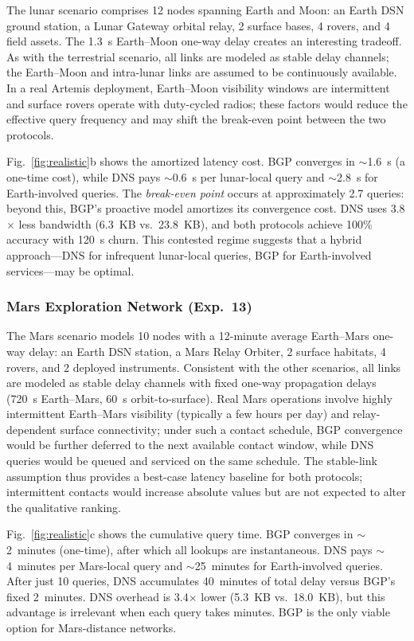 \documentclass[journal,twocolumn]{IEEEtran}
\begin{document}
The lunar scenario comprises 12 nodes spanning Earth and Moon: an Earth DSN ground station, a Lunar Gateway orbital relay, 2 surface bases, 4 rovers, and 4 field assets.
The 1.3~s Earth--Moon one-way delay creates an interesting tradeoff.
As with the terrestrial scenario, all links are modeled as stable delay channels; the Earth--Moon and intra-lunar links are assumed to be continuously available.
In a real Artemis deployment, Earth--Moon visibility windows are intermittent and surface rovers operate with duty-cycled radios; these factors would reduce the effective query frequency and may shift the break-even point between the two protocols.

Fig.~\ref{fig:realistic}b shows the amortized latency cost. 
BGP converges in $\sim$1.6~s (a one-time cost), while DNS pays $\sim$0.6~s per lunar-local query and $\sim$2.8~s for Earth-involved queries. 
The \emph{break-even point} occurs at approximately 2.7 queries: beyond this, BGP's proactive model amortizes its convergence cost. 
DNS uses 3.8$\times$ less bandwidth (6.3~KB vs.\ 23.8~KB), and both protocols achieve 100\% accuracy with 120~s churn. 
This contested regime suggests that a hybrid approach---DNS for infrequent lunar-local queries, BGP for Earth-involved services---may be optimal.

\subsubsection{Mars Exploration Network (Exp.~13)}

The Mars scenario models 10 nodes with a 12-minute average Earth--Mars one-way delay: an Earth DSN station, a Mars Relay Orbiter, 2 surface habitats, 4 rovers, and 2 deployed instruments.
Consistent with the other scenarios, all links are modeled as stable delay channels with fixed one-way propagation delays (720~s Earth--Mars, 60~s orbit-to-surface).
Real Mars operations involve highly intermittent Earth--Mars visibility (typically a few hours per day) and relay-dependent surface connectivity; under such a contact schedule, BGP convergence would be further deferred to the next available contact window, while DNS queries would be queued and serviced on the same schedule.
The stable-link assumption thus provides a best-case latency baseline for both protocols; intermittent contacts would increase absolute values but are not expected to alter the qualitative ranking.

Fig.~\ref{fig:realistic}c shows the cumulative query time. 
BGP converges in $\sim$2~minutes (one-time), after which all lookups are instantaneous. 
DNS pays $\sim$4~minutes per Mars-local query and $\sim$25~minutes for Earth-involved queries. 
After just 10 queries, DNS accumulates 40~minutes of total delay versus BGP's fixed 2~minutes. 
DNS overhead is 3.4$\times$ lower (5.3~KB vs.\ 18.0~KB), but this advantage is irrelevant when each query takes minutes. 
BGP is the only viable option for Mars-distance networks.
\end{document}
